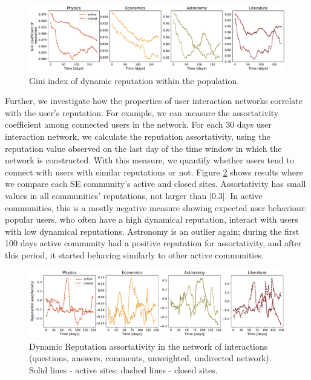 \begin{figure}[h]
	\centering
	\includegraphics[width=1\linewidth]{figures/stackexchange/gini.pdf}
	\caption[Gini index of dynamic reputation]{Gini index of dynamic reputation within the population.}
	\label{fig:dynrep-gini}
\end{figure} 

Further, we investigate how the properties of user interaction networks correlate with the user’s reputation. For example, we can measure the assortativity coefficient among connected users in the network. For each 30 days user interaction network, we calculate the reputation assortativity, using the reputation value observed on the last day of the time window in which the network is constructed. With this measure, we quantify whether users tend to connect with users with similar reputations or not. Figure \ref{fig:dyn_rep_assort} shows results where we compare each SE community’s active and closed sites. Assortativity has small values in all communities’ reputations, not larger than $|0.3|$. In active communities, this is a mostly negative measure showing expected user behaviour: popular users, who often have a high dynamical reputation, interact with users with low dynamical reputations. Astronomy is an outlier again; during the first 100 days active community had a positive reputation for assortativity, and after this period, it started behaving similarly to other active communities. 

\begin{figure}[h]
	\centering
	\includegraphics[width=1\linewidth]{figures/stackexchange/reputation_assortativity.pdf}
	\caption[Dynamic Reputation assortativity]{Dynamic Reputation assortativity in the network of interactions (questions, answers, comments, unweighted, undirected network). Solid lines - active sites; dashed lines - closed sites.}
	\label{fig:dyn_rep_assort}
\end{figure}

